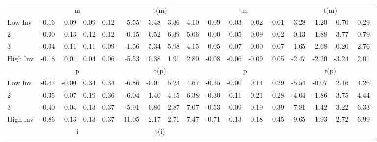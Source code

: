 \begin{table}[!ht]
\begin{tabular}{lrrrrrrrrrrrrrrrr}
  
    
      & \multicolumn{4}{c}{m} & \multicolumn{4}{c}{t(m)}
    
      & \multicolumn{4}{c}{m} & \multicolumn{4}{c}{t(m)}
    
    \\
      \cmidrule(r){2-5} \cmidrule(r){6-9} \cmidrule(r){10-13} \cmidrule(r){14-17}

    Low Inv   & -0.16  & 0.09  & 0.09  & 0.12  & -5.55  & 3.48  & 3.36  & 4.10  & -0.09  & -0.03  & 0.02  & -0.01  & -3.28  & -1.20  & 0.70  & -0.29  \\
           2  & -0.00  & 0.13  & 0.12  & 0.12  & -0.15  & 6.52  & 6.39  & 5.06  & 0.00  & 0.05  & 0.09  & 0.02  & 0.13  & 1.88  & 3.77  & 0.79  \\
           3  & -0.04  & 0.11  & 0.11  & 0.09  & -1.56  & 5.34  & 5.98  & 4.15  & 0.05  & 0.07  & -0.00  & 0.07  & 1.65  & 2.68  & -0.20  & 2.76  \\
    High Inv  & -0.18  & 0.01  & 0.04  & 0.06  & -5.53  & 0.38  & 1.91  & 2.80  & -0.08  & -0.06  & -0.09  & 0.05  & -2.47  & -2.20  & -3.24  & 2.01  \\

  
    
      & \multicolumn{4}{c}{p} & \multicolumn{4}{c}{t(p)}
    
      & \multicolumn{4}{c}{p} & \multicolumn{4}{c}{t(p)}
    
    \\
      \cmidrule(r){2-5} \cmidrule(r){6-9} \cmidrule(r){10-13} \cmidrule(r){14-17}

    Low Inv   & -0.47  & -0.00  & 0.34  & 0.34  & -6.86  & -0.01  & 5.23  & 4.67  & -0.35  & -0.00  & 0.14  & 0.29  & -5.54  & -0.07  & 2.16  & 4.26  \\
           2  & -0.35  & 0.07  & 0.19  & 0.36  & -6.04  & 1.40  & 4.15  & 6.38  & -0.30  & -0.11  & 0.21  & 0.28  & -4.04  & -1.86  & 3.75  & 4.44  \\
           3  & -0.40  & -0.04  & 0.13  & 0.37  & -5.91  & -0.86  & 2.87  & 7.07  & -0.53  & -0.09  & 0.19  & 0.39  & -7.81  & -1.42  & 3.22  & 6.33  \\
    High Inv  & -0.86  & -0.13  & 0.13  & 0.37  & -11.05  & -2.17  & 2.71  & 7.47  & -0.71  & -0.13  & 0.18  & 0.45  & -9.65  & -1.93  & 2.72  & 6.99  \\

  
    
      & \multicolumn{4}{c}{i} & \multicolumn{4}{c}{t(i)}
    

\end{tabular}
\end{table}
